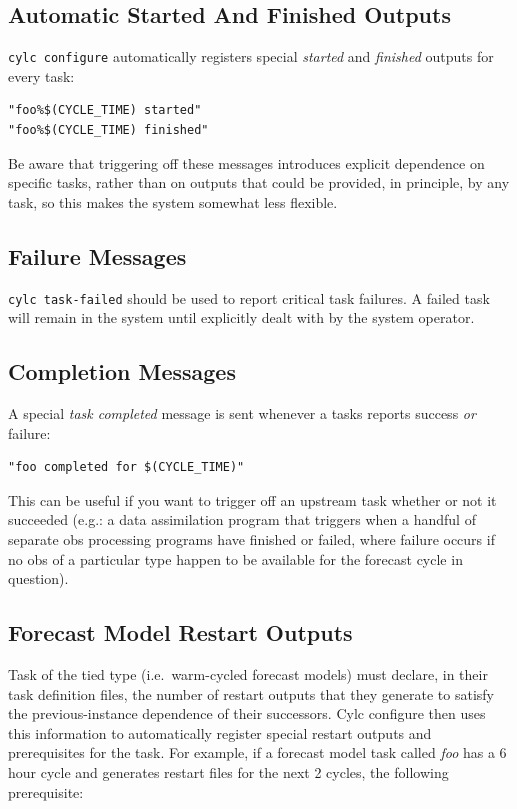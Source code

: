\documentclass[11pt,a4paper]{article}
\begin{document}
\subsection{Automatic Started And Finished Outputs}

\lstinline=cylc configure= automatically registers special {\em started}
and {\em finished} outputs for every task: 

\begin{lstlisting}
"foo%$(CYCLE_TIME) started"
"foo%$(CYCLE_TIME) finished"
\end{lstlisting}

Be aware that triggering off these messages introduces explicit
dependence on specific tasks, rather than on outputs that could be
provided, in principle, by any task, so this makes the system somewhat
less flexible.


\subsection{Failure Messages}

\lstinline=cylc task-failed= should be used to report critical task
failures. A failed task will remain in the system until explicitly dealt
with by the system operator.

\subsection{Completion Messages}

A special {\em task completed} message is sent whenever a tasks reports
success {\em or} failure:
\begin{lstlisting}
"foo completed for $(CYCLE_TIME)"
\end{lstlisting}
 
This can be useful if you want to trigger off an upstream task whether
or not it succeeded (e.g.: a data assimilation program that triggers
when a handful of separate obs processing programs have finished or
failed, where failure occurs if no obs of a particular type happen to be
available for the forecast cycle in question).


\subsection{Forecast Model Restart Outputs}

Task of the tied type (i.e.\ warm-cycled forecast models) must declare,
in their task definition files, the number of restart outputs that they
generate to satisfy the previous-instance dependence of their
successors. Cylc configure then uses this information to automatically
register special restart outputs and prerequisites for the task. For
example, if a forecast model task called {\em foo} has a 6 hour cycle
and generates restart files for the next 2 cycles, the following
prerequisite:
\end{document}

